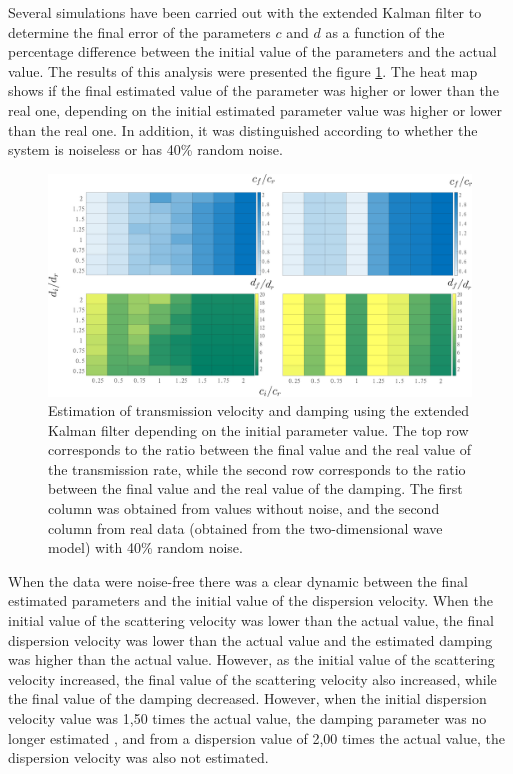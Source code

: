 \documentclass[12pt, a4paper]{article} %
\begin{document}
Several simulations have been carried out with the extended Kalman filter to determine the final error of the parameters $c$ and $d$ as a function of the percentage difference between the initial value of the parameters and the actual value. The results of this analysis were presented the figure \ref{fig:valorescd}. The heat map shows if the final estimated value of the parameter was higher or lower than the real one, depending on the initial estimated parameter value was higher or lower than the real one. In addition, it was distinguished according to whether the system is noiseless or has 40\% random noise.

\begin{figure}[h!]
    \centering
    \includegraphics[width=1\textwidth]{figures/dependencia_valores_iniciales_1.png}
    \caption{Estimation of  transmission velocity and damping using the extended Kalman filter depending on the initial parameter value. The top row corresponds to the ratio between the final value and the real value of the transmission rate, while the second row corresponds to the ratio between the final value and the real value of the damping. The first column was obtained from values without noise, and the second column from real data (obtained from the two-dimensional wave model) with 40\% random noise.}
    \label{fig:valorescd}
\end{figure}

When the data were noise-free there was a clear dynamic between the final estimated parameters and the initial value of the dispersion velocity. When the initial value of the scattering velocity was lower than the actual value, the final dispersion velocity was lower than the actual value and the estimated damping was higher than the actual value. However, as the initial value of the scattering velocity increased, the final value of the scattering velocity also increased, while the final value of the damping decreased. However, when the initial dispersion velocity value was 1,50 times the actual value, the damping parameter was no longer estimated , and from a dispersion value of 2,00 times the actual value, the dispersion velocity was also not estimated.
\end{document}
